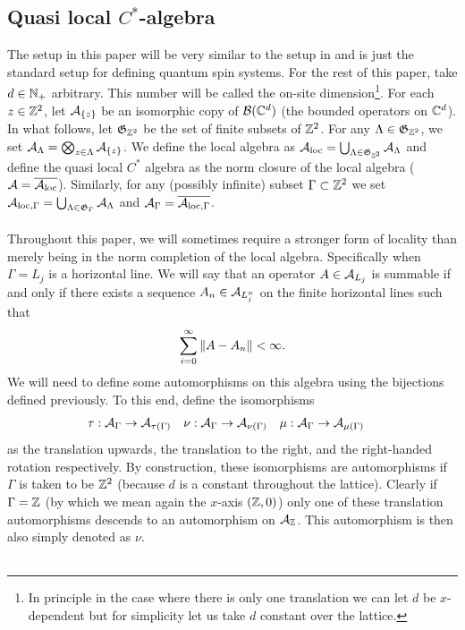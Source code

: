 \documentclass[11pt,a4paper,twoside]{article}
\numberwithin{equation}{section}
\begin{document}
	\subsection{Quasi local \texorpdfstring{$C^*$}{}-algebra}\label{sec:QuasiLocalC*Algebra}
	The setup in this paper will be very similar to the setup in \cite{ogata2021h3gmathbb} and is just the standard setup for defining quantum spin systems. For the rest of this paper, take $d\in\NN_+$ arbitrary. This number will be called the on-site dimension\footnote{In principle in the case where there is only one translation we can let $d$ be $x$-dependent but for simplicity let us take $d$ constant over the lattice.}. For each $z\in\ZZ^2$, let $\AA_{\{z\}}$ be an isomorphic copy of $\BB(\CC^d)$ (the bounded operators on $\CC^d$). In what follows, let $\mathfrak{G}_{\ZZ^2}$ be the set of finite subsets of $\ZZ^2$. For any $\Lambda\in\mathfrak{G}_{\ZZ^2}$, we set $\AA_\Lambda=\bigotimes_{z\in\Lambda}\AA_{\{z\}}$. We define the local algebra as $\AA_{\text{loc}}=\bigcup_{\Lambda\in \mathfrak{G}_{\ZZ^2}}\AA_{\Lambda}$ and define the quasi local $C^*$ algebra as the norm closure of the local algebra ($\AA=\overline{\AA_{\text{loc}}}$). Similarly, for any (possibly infinite) subset $\Gamma\subset\ZZ^2$ we set $\AA_{\text{loc},\Gamma}=\bigcup_{\Lambda\in \mathfrak{G}_{\Gamma}}\AA_{\Lambda}$ and $\AA_\Gamma=\overline{\AA_{\text{loc},\Gamma}}$.\\\\
	Throughout this paper, we will sometimes require a stronger form of locality than merely being in the norm completion of the local algebra. Specifically when $\Gamma=L_j$ is a horizontal line. We will say that an operator $A\in\AA_{L_j}$ is summable if and only if there exists a sequence $A_n\in\AA_{L_{j}^n}$ on the finite horizontal lines such that
	\begin{equation}
		\sum_{i=0}^{\infty}\norm{A-A_n}<\infty.
	\end{equation}
	We will need to define some automorphisms on this algebra using the bijections defined previously. To this end, define the isomorphisms
	\begin{align}
		\tau&:\AA_\Gamma\rightarrow\AA_{\tau(\Gamma)}&\nu&:\AA_\Gamma\rightarrow\AA_{\nu(\Gamma)}&\mu&:\AA_\Gamma\rightarrow\AA_{\mu(\Gamma)}
	\end{align}
	as the translation upwards, the translation to the right, and the right-handed rotation respectively. By construction, these isomorphisms are automorphisms if $\Gamma$ is taken to be $\ZZ^2$ (because $d$ is a constant throughout the lattice). Clearly if $\Gamma=\ZZ$ (by which we mean again the $x$-axis $(\ZZ,0)$) only one of these translation automorphisms descends to an automorphism on $\AA_{\ZZ}$. This automorphism is then also simply denoted as $\nu$.\\\\
\end{document}
